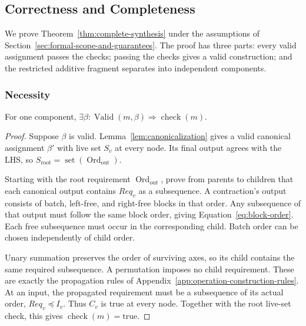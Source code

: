 \subsection{Correctness and Completeness}
\label{app:correctness-and-completeness}
We prove Theorem~\ref{thm:complete-synthesis} under the assumptions of
Section~\ref{sec:formal-scope-and-guarantees}. The proof has three parts: every valid
assignment passes the checks; passing the checks gives a valid construction;
and the restricted additive fragment separates into independent components.

\subsubsection{Necessity}
\begin{lemma}[Necessity]
\label{lem:necessity}
For one component,
$\exists\beta:\operatorname{Valid}(m,\beta)\Rightarrow\operatorname{check}(m)$.
\end{lemma}
\begin{proof}
Suppose $\beta$ is valid. Lemma~\ref{lem:canonicalization} gives a valid
canonical assignment $\beta'$ with live set $S_v$ at every node. Its final
output agrees with the LHS, so
$S_{\mathrm{root}}=\operatorname{set}(\operatorname{Ord}_{\mathrm{out}})$.

Starting with the root requirement $\operatorname{Ord}_{\mathrm{out}}$, prove from parents to children that
each canonical output contains $Req_v$ as a subsequence. A contraction's
output consists of batch, left-free, and right-free blocks in that order.
Any subsequence of that output must follow the same block order, giving
Equation~\eqref{eq:block-order}. Each free subsequence must occur in the
corresponding child. Batch order can be chosen independently of child order.

Unary summation preserves the order of surviving axes, so its child contains
the same required subsequence. A permutation imposes no child requirement.
These are exactly the propagation rules of
Appendix~\ref{app:operation-construction-rules}. At an input, the propagated
requirement must be a subsequence of its actual order, $Req_v\preceq I_v$.
Thus $C_v$ is true at every node. Together with the root live-set check,
this gives $\operatorname{check}(m)=\mathrm{true}$.
\end{proof}

